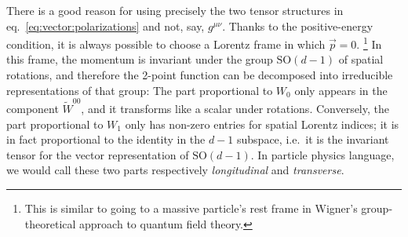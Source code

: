 \documentclass[a4paper,12pt]{article}
\newcommand{\SO}{\text{SO}}
\numberwithin{equation}{section}
\begin{document}
There is a good reason for using precisely the two tensor structures in eq.~\eqref{eq:vector:polarizations} and not, say, $g^{\mu\nu}$. Thanks to the positive-energy condition, it is always possible to choose a Lorentz frame in which $\vec{p} = 0$.%
%
\footnote{This is similar to going to a massive particle's rest frame in Wigner's group-theoretical approach to quantum field theory.}
%
In this frame, the momentum is invariant under the group $\SO(d-1)$ of spatial rotations, and therefore the 2-point function can be decomposed into irreducible representations of that group: The part proportional to $W_0$ only appears in the component $\widetilde{W}^{00}$, and it transforms like a scalar under rotations. Conversely, the part proportional to $W_1$ only has non-zero entries for spatial Lorentz indices; it is in fact proportional to the identity in the $d-1$ subspace, i.e.~it is the invariant tensor for the vector representation of $\SO(d-1)$.
In particle physics language, we would call these two parts respectively \emph{longitudinal} and \emph{transverse}.
\end{document}
